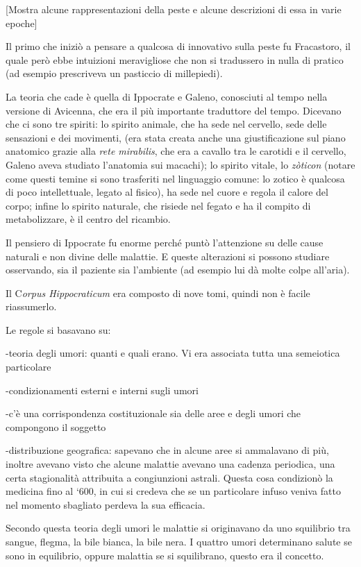 \documentclass[]{article}
\begin{document}
{[}Mostra alcune rappresentazioni della peste e alcune descrizioni di
essa in varie epoche{]}

Il primo che iniziò a pensare a qualcosa di innovativo sulla peste fu
Fracastoro, il quale però ebbe intuizioni meravigliose che non si
tradussero in nulla di pratico (ad esempio prescriveva un pasticcio di
millepiedi).

La teoria che cade è quella di Ippocrate e Galeno, conosciuti al tempo
nella versione di Avicenna, che era il più importante traduttore del
tempo. Dicevano che ci sono tre spiriti: lo spirito animale, che ha sede
nel cervello, sede delle sensazioni e dei movimenti, (era stata creata
anche una giustificazione sul piano anatomico grazie alla \emph{rete
mirabilis}, che era a cavallo tra le carotidi e il cervello, Galeno
aveva studiato l'anatomia sui macachi); lo spirito vitale, lo
\emph{zòticon} (notare come questi temine si sono trasferiti nel
linguaggio comune: lo zotico è qualcosa di poco intellettuale, legato al
fisico), ha sede nel cuore e regola il calore del corpo; infine lo
spirito naturale, che risiede nel fegato e ha il compito di
metabolizzare, è il centro del ricambio.

Il pensiero di Ippocrate fu enorme perché puntò l'attenzione su delle
cause naturali e non divine delle malattie. E queste alterazioni si
possono studiare osservando, sia il paziente sia l'ambiente (ad esempio
lui dà molte colpe all'aria).

Il C\emph{orpus Hippocraticum} era composto di nove tomi, quindi non è
facile riassumerlo.

Le regole si basavano su:

-teoria degli umori: quanti e quali erano. Vi era associata tutta una
semeiotica particolare

-condizionamenti esterni e interni sugli umori

-c'è una corrispondenza costituzionale sia delle aree e degli umori che
compongono il soggetto

-distribuzione geografica: sapevano che in alcune aree si ammalavano di
più, inoltre avevano visto che alcune malattie avevano una cadenza
periodica, una certa stagionalità attribuita a congiunzioni astrali.
Questa cosa condizionò la medicina fino al `600, in cui si credeva che
se un particolare infuso veniva fatto nel momento sbagliato perdeva la
sua efficacia.

Secondo questa teoria degli umori le malattie si originavano da uno
squilibrio tra sangue, flegma, la bile bianca, la bile nera. I quattro
umori determinano salute se sono in equilibrio, oppure malattia se si
squilibrano, questo era il concetto.
\end{document}

